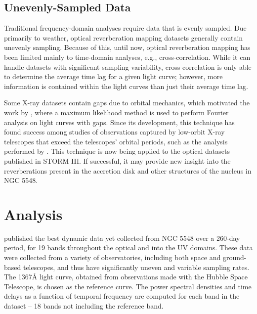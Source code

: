 \documentclass[11pt,letterpaper]{article}
\begin{document}
\begin{figure}
\begin{minipage}{.475\textwidth}
            \label{fig:th_freq}
        \end{minipage}
    \end{figure}


	\subsection{Unevenly-Sampled Data}

    Traditional frequency-domain analyses require data that is evenly sampled. Due primarily to weather, optical reverberation mapping datasets generally contain unevenly sampling. Because of this, until now, optical reverberation mapping has been limited mainly to time-domain analyses, e.g., cross-correlation. While it can handle datasets with significant sampling-variability, cross-correlation is only able to determine the average time lag for a given light curve; however, more information is contained within the light curves than just their average time lag.

    Some X-ray datasets contain gaps due to orbital mechanics, which motivated the work by \cite{2013ApJ...777...24Z}, where a maximum likelihood method is used to perform Fourier analysis on light curves with gaps. Since its development, this technique has found success among studies of observations captured by low-orbit X-ray telescopes that exceed the telescopes' orbital periods, such as the analysis performed by \cite{2016arXiv160606736K}. This technique is now being applied to the optical datasets published in STORM III. If successful, it may provide new insight into the reverberations present in the accretion disk and other structures of the nucleus in NGC 5548.
 	
\section{Analysis}

\cite{2016ApJ...821...56F} published the best dynamic data yet collected from NGC 5548 over a 260-day period, for 19 bands throughout the optical and into the UV domains. These data were collected from a variety of observatories, including both space and ground-based telescopes, and thus have significantly uneven and variable sampling rates. The 1367\AA$ $ light curve, obtained from observations made with the Hubble Space Telescope, is chosen as the reference curve. The power spectral densities and time delays as a function of temporal frequency are computed for each band in the dataset -- 18 bands not including the reference band.
\end{document}
